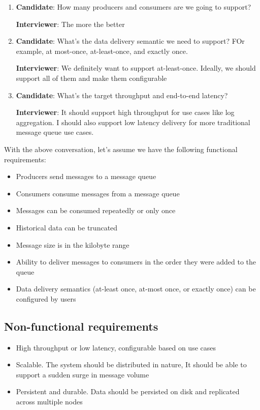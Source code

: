 \documentclass{report}
\theoremstyle{definition}
\let\oldsubsection\subsection
\renewcommand{\subsection}{\oldsubsection*}
\begin{document}
\begin{enumerate}
\item

\textbf{Candidate}: How many producers and consumers are we going to support?

\textbf{Interviewer}: The more the better

\item

\textbf{Candidate}: What's the data delivery semantic we need to support? FOr example, at most-once, at-least-once, and exactly once.

\textbf{Interviewer}: We definitely want to support at-least-once. Ideally, we should support all of them and make them configurable

\item

\textbf{Candidate}: What's the target throughput and end-to-end latency?

\textbf{Interviewer}: It should support high throughput for use cases like log aggregation. I should also support low latency delivery for more traditional message queue use cases.
\end{enumerate}

With the above conversation, let's assume we have the following functional requirements:

\begin{itemize}
\item
Producers send messages to a message queue
\item
Consumers consume messages from a message queue
\item
Messages can be consumed repeatedly or only once
\item
Historical data can be truncated
\item
Message size is in the kilobyte range
\item
Ability to deliver messages to consumers in the order they were added to the queue
\item
Data delivery semantics (at-least once, at-most once, or exactly once) can be configured by users
\end{itemize}

\subsection{Non-functional requirements}

\begin{itemize}
\item
High throughput or low latency, configurable based on use cases
\item
Scalable. The system should be distributed in nature, It should be able to support a sudden surge in message volume
\item
Persistent and durable. Data should be persisted on disk and replicated across multiple nodes
\end{itemize}
\end{document}
